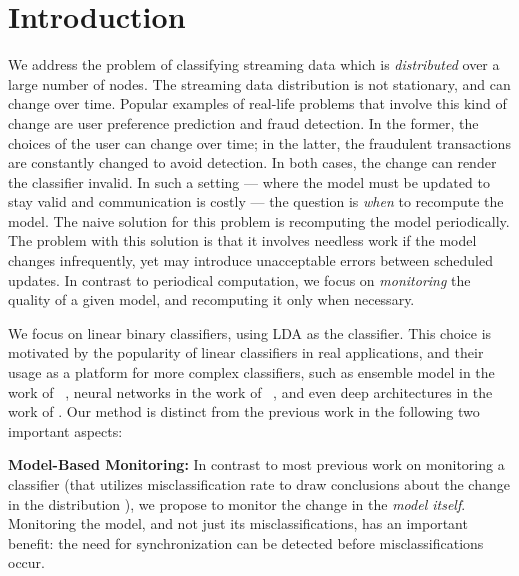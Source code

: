 \section{Introduction}

We address the problem of classifying streaming data which
is \textit{distributed} over a large number of nodes. The streaming data distribution is not stationary, and can change over time. Popular examples of real-life problems that involve this kind of change are user preference prediction and fraud detection. In the former, the choices of the user can change over time; in the latter, the fraudulent transactions are constantly changed to avoid detection. In both cases, the change can render the classifier invalid.
In such a setting --- where the model must be updated to stay valid and communication is costly --- the question is \textit{when} to recompute the model. The naive solution for this problem is recomputing the model periodically. The problem with this solution is that it involves needless work if the model changes infrequently, yet may introduce unacceptable errors between scheduled updates. 
In contrast to periodical computation, we focus on \textit{monitoring} the quality of a given model, and recomputing it only when necessary. 
\par We focus on linear binary classifiers, using LDA \cite{fisher1936use} as the classifier. This choice is motivated by the popularity of linear classifiers in real applications, and their usage as a platform for more complex classifiers, such as ensemble model in the work of ~\cite{Deva, eSVM}, neural networks in the work of ~\cite{osadchy2015k}, 
and even deep architectures in the work of \cite{ROSS}. Our method is distinct from the previous work in the following two important aspects:

\noindent \textbf{Model-Based Monitoring:} 
In contrast to most previous work on monitoring a classifier (that utilizes misclassification rate to draw conclusions about the change in the distribution 
\cite{baena2006early, gama2004learning, nishida2007detecting}), we propose to monitor the change in the \textit{model itself}.
Monitoring the model, and not just its misclassifications, has an important benefit: the need for synchronization can be detected before misclassifications occur. 

